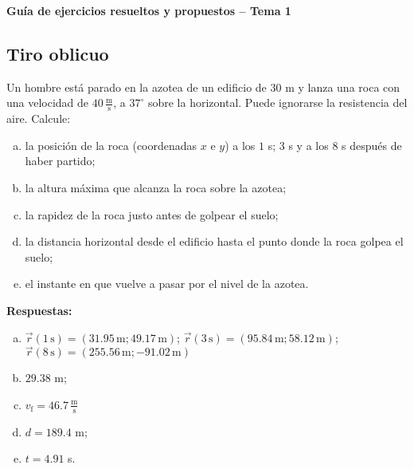 \documentclass[addpoints]{exam}
\newcommand{\grado}[0]{^{\circ}}
\newcommand{\rtas}{\textbf{Respuestas: }}
\begin{document}
\renewcommand{\tablename}{Tabla}


\begin{tcolorbox}[colback=white,arc=0mm,colframe=black]
    \begin{center}
        \Large\textbf{Guía de ejercicios resueltos y propuestos -- Tema 1}
    \end{center}
\end{tcolorbox}

\vspace{11pt}

\begin{questions}

    \section{Tiro oblicuo}

    \question Un hombre está parado en la azotea de un edificio de $30$ m y lanza una roca con una velocidad de $40 \, \frac{\text{m}}{\text{s}}$, a $37\grado$ sobre la horizontal. Puede ignorarse la resistencia del aire. Calcule: 
    \begin{enumerate}[a)]
        \item la posición de la roca (coordenadas $x$ e $y$) a los $1$ s; $3$ s y a los $8$ s después de haber partido;
        \item la altura máxima que alcanza la roca sobre la azotea;
        \item la rapidez de la roca justo antes de golpear el suelo;
        \item la distancia horizontal desde el edificio hasta el punto donde la roca golpea el suelo;
        \item el instante en que vuelve a pasar por el nivel de la azotea.
    \end{enumerate}

    \rtas
    \begin{enumerate}[a)]
        \item $\vec{r} (1 \, \text{s}) = \left(31.95 \, \text{m} ; 49.17 \, \text{m} \right) $; $\vec{r} (3 \, \text{s}) = \left( 95.84 \, \text{m} ; 58.12 \, \text{m} \right) $; $\vec{r} (8 \, \text{s}) = \left( 255.56 \, \text{m} ; -91.02 \, \text{m} \right) $
        \item $29.38$ m;
        \item $v_\text{f} = 46.7 \, \frac{\text{m}}{\text{s}}$
        \item $d = 189.4$ m;
        \item $t = 4.91$ s.
    \end{enumerate}


\end{questions}
\end{document}
